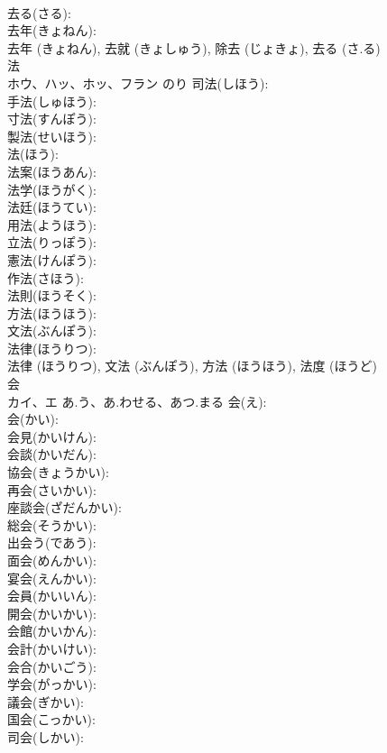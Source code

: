 \documentclass[8pt]{extreport}
\begin{document}
\begin{CJK}{UTF8}{min}
\\	去る(さる): 
\\	去年(きょねん): 
\\	去年 (きょねん), 去就 (きょしゅう), 除去 (じょきょ), 去る (さ.る)
\\	法			
\\	ホウ、ハッ、ホッ、フラン	のり	司法(しほう): 
\\	手法(しゅほう): 
\\	寸法(すんぽう): 
\\	製法(せいほう): 
\\	法(ほう): 
\\	法案(ほうあん): 
\\	法学(ほうがく): 
\\	法廷(ほうてい): 
\\	用法(ようほう): 
\\	立法(りっぽう): 
\\	憲法(けんぽう): 
\\	作法(さほう): 
\\	法則(ほうそく): 
\\	方法(ほうほう): 
\\	文法(ぶんぽう): 
\\	法律(ほうりつ): 
\\	法律 (ほうりつ), 文法 (ぶんぽう), 方法 (ほうほう), 法度 (ほうど)
\\	会			
\\	カイ、エ	あ.う、あ.わせる、あつ.まる	会(え): 
\\	会(かい): 
\\	会見(かいけん): 
\\	会談(かいだん): 
\\	協会(きょうかい): 
\\	再会(さいかい): 
\\	座談会(ざだんかい): 
\\	総会(そうかい): 
\\	出会う(であう): 
\\	面会(めんかい): 
\\	宴会(えんかい): 
\\	会員(かいいん): 
\\	開会(かいかい): 
\\	会館(かいかん): 
\\	会計(かいけい): 
\\	会合(かいごう): 
\\	学会(がっかい): 
\\	議会(ぎかい): 
\\	国会(こっかい): 
\\	司会(しかい): 

\end{CJK}
\end{document}
